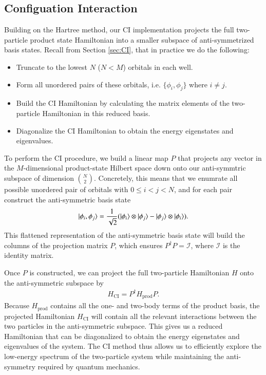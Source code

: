 \documentclass{subfiles}
\begin{document}
\subsection{Configuation Interaction}\label{sec:CI_method}
Building on the Hartree method, our CI implementation projects the full two-particle product state Hamiltonian into a smaller subspace of anti-symmetrized basis states. Recall from Section \ref{sec:CI}, that in practice we do the following:
\begin{itemize}
    \item Truncate to the lowest $N$ ($N<M$) orbitals in each well.
    \item Form all unordered pairs of these orbitals, i.e. $\{\phi_i, \phi_j\}$ where $i \neq j$.
    \item Build the CI Hamiltonian by calculating the matrix elements of the two-particle Hamiltonian in this reduced basis.
    \item Diagonalize the CI Hamiltonian to obtain the energy eigenstates and eigenvalues.
\end{itemize}
To perform the CI procedure, we build a linear map $P$ that projects any vector in the $M$-dimensional product-state Hilbert space down onto our anti-symmtric subspace of dimension $\binom{N}{2}$. Concretely, this means that we enumrate all possible unordered pair of orbitals with $0\leq i < j < N$, and for each pair construct the anti-symmetric basis state
\begin{align*}
    \ket{\phi_i, \phi_j} = \frac{1}{\sqrt{2}}(\ket{\phi_i}\otimes\ket{\phi_j} - \ket{\phi_j}\otimes\ket{\phi_i}).
\end{align*}
This flattened representation of the anti-symmetric basis state will build the columns of the projection matrix $P$, which ensures $P^\dagger P = \mathcal{I}$, where $\mathcal{I}$ is the identity matrix. 

Once $P$ is constructed, we can project the full two-particle Hamiltonian $H$ onto the anti-symmetric subspace by
\begin{align*}
    H_{\text{CI}} = P^\dagger H_{\text{prod}} P.
\end{align*}
Because $H_{\text{prod}}$ contains all the one- and two-body terms of the product basis, the projected Hamiltonian $H_{\text{CI}}$ will contain all the relevant interactions between the two particles in the anti-symmetric subspace. This gives us a reduced Hamiltonian that can be diagonalized to obtain the energy eigenstates and eigenvalues of the system. The CI method thus allows us to efficiently explore the low-energy spectrum of the two-particle system while maintaining the anti-symmetry required by quantum mechanics. 
\end{document}
